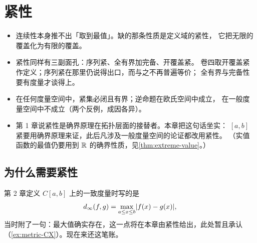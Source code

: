 \chapter{紧性}
\label{ch:compactness}

\begin{keypoint}[本章要点]
  \begin{itemize}
    \item 连续性本身推不出「取到最值」。缺的那条性质是定义域的紧性，
          它把无限的覆盖化为有限的覆盖。
    \item 紧性同样有三副面孔：序列紧、全有界加完备、开覆盖紧。
          卷四取开覆盖紧作定义；序列紧在那里仍说得出口，而与之不再普遍等价；
          全有界与完备性要有度量才谈得上。
    \item 在任何度量空间中，紧集必闭且有界；逆命题在欧氏空间中成立，
          在一般度量空间中不成立（两个反例，成因各异）。
    \item 第 1 章说紧性是确界原理在拓扑层面的接替者。本章把这句话坐实：
          \([a,b]\) 紧要用确界原理来证，此后凡涉及一般度量空间的论证都改用紧性。
          （实值函数的最值仍要用到 \(\mathbb{R}\) 的确界性质，见\cref{thm:extreme-value}。）
  \end{itemize}
\end{keypoint}

\section{为什么需要紧性}
\label{sec:why-compact}

第 2 章定义 \(C[a,b]\) 上的一致度量时写的是
\begin{equation}
  \label{eq:uniform-metric-recall}
  d_{\infty}(f,g) = \max_{a \le x \le b} \lvert f(x)-g(x)\rvert ,
\end{equation}
当时附了一句：最大值确实存在，这一点将在本章由紧性给出，此处暂且承认
（\cref{ex:metric-CX}）。现在来还这笔账。


